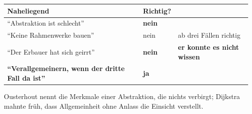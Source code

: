 \begin{warnung}
\begin{center}
\renewcommand{\arraystretch}{1.5}
\begin{tabular}{@{}P{3.2cm}P{2.2cm}P{2.4cm}@{}}
\toprule
\textbf{Naheliegend} & \textbf{Richtig?} & \\
\midrule
\enquote{Abstraktion ist schlecht} & \textcolor{akzent}{\textbf{nein}} & \\
\enquote{Keine Rahmenwerke bauen} & \textcolor{akzent}{nein} & \textcolor{akzent}{ab drei Fällen richtig}\\
\enquote{Der Erbauer hat sich geirrt} & \textcolor{akzent}{\textbf{nein}} & \textbf{er konnte es nicht wissen}\\
\textbf{\enquote{Verallgemeinern, wenn der dritte Fall da ist}} & \textcolor{gruen}{\textbf{ja}} & \\
\bottomrule
\end{tabular}
\end{center}

\begin{center}
\begin{minipage}{0.88\textwidth}
\end{minipage}
\end{center}

\begin{center}
\end{center}
\end{warnung}
\vspace{-4pt}
\noindent Ous\-ter\-hout nennt die Merk\-ma\-le einer Ab\-strak\-tion, die nichts ver\-birgt; Dijkstra mahnte früh, dass All\-ge\-mein\-heit ohne An\-lass die Ein\-sicht ver\-stellt.
